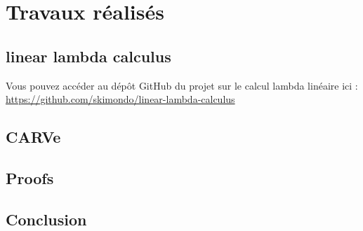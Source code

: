 %
\chapter{Travaux réalisés}
\label{sec::chapitre4}

\section{linear lambda calculus}
Vous pouvez accéder au dépôt GitHub du projet sur le calcul lambda linéaire ici : \url{https://github.com/skimondo/linear-lambda-calculus}

\section{CARVe}

\section{Proofs}

\section{Conclusion}